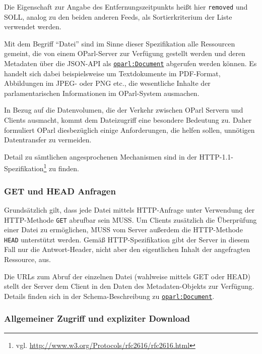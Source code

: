 \documentclass[,a4paper]{article}
\begin{document}
Die Eigenschaft zur Angabe des Entfernungszeitpunkts heißt hier
\texttt{removed} und SOLL, analog zu den beiden anderen Feeds, als
Sortierkriterium der Liste verwendet werden.


Mit dem Begriff ``Datei'' sind im Sinne dieser Spezifikation alle
Ressourcen gemeint, die von einem OParl-Server zur Verfügung gestellt
werden und deren Metadaten über die JSON-API als
\hyperref[oparlux5fdocument]{\texttt{oparl:Document}} abgerufen werden
können. Es handelt sich dabei beispielsweise um Textdokumente im
PDF-Format, Abbildungen im JPEG- oder PNG etc., die wesentliche Inhalte
der parlamentarischen Informationen im OParl-System ausmachen.

In Bezug auf die Datenvolumen, die der Verkehr zwischen OParl Servern
und Clients ausmacht, kommt dem Dateizugriff eine besondere Bedeutung
zu. Daher formuliert OParl diesbezüglich einige Anforderungen, die
helfen sollen, unnötigen Datentransfer zu vermeiden.

Detail zu sämtlichen angesprochenen Mechanismen sind in der
HTTP-1.1-Spezifikation\footnote{vgl.
  \url{http://www.w3.org/Protocols/rfc2616/rfc2616.html}} zu finden.

\subsubsection{GET und HEAD Anfragen}\label{get-und-head-anfragen}

Grundsätzlich gilt, dass jede Datei mittels HTTP-Anfrage unter
Verwendung der HTTP-Methode \texttt{GET} abrufbar sein MUSS. Um Clients
zusätzlich die Überprüfung einer Datei zu ermöglichen, MUSS vom Server
außerdem die HTTP-Methode \texttt{HEAD} unterstützt werden. Gemäß
HTTP-Spezifikation gibt der Server in diesem Fall nur die
Antwort-Header, nicht aber den eigentlichen Inhalt der angefragten
Ressource, aus.

Die URLs zum Abruf der einzelnen Datei (wahlweise mittels GET oder HEAD)
stellt der Server dem Client in den Daten des Metadaten-Objekts zur
Verfügung. Details finden sich in der Schema-Beschreibung zu
\hyperref[oparlux5fdocument]{\texttt{oparl:Document}}.

\subsubsection{Allgemeiner Zugriff und expliziter
Download}\label{allgemeiner-zugriff-und-expliziter-download}
\end{document}
